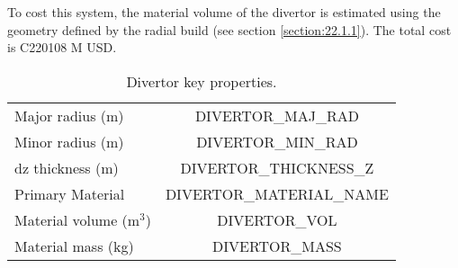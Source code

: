 To cost this system, the material volume of the divertor is estimated using the geometry defined by the radial build (see section \ref{section:22.1.1}). The total cost is C220108 M USD.


 
 \begin{table}
     \centering
     \begin{tabular}{lc}
         Major radius (m) & DIVERTOR_MAJ_RAD \\
         Minor radius (m) & DIVERTOR_MIN_RAD \\
         dz thickness (m) & DIVERTOR_THICKNESS_Z \\
         Primary Material & DIVERTOR_MATERIAL_NAME \\
         Material volume (m$^3$) & DIVERTOR_VOL \\
         Material mass (kg) & DIVERTOR_MASS \\
     \end{tabular}
     \caption{Divertor key properties.}
     \label{tab:divertor prop}
 \end{table}
